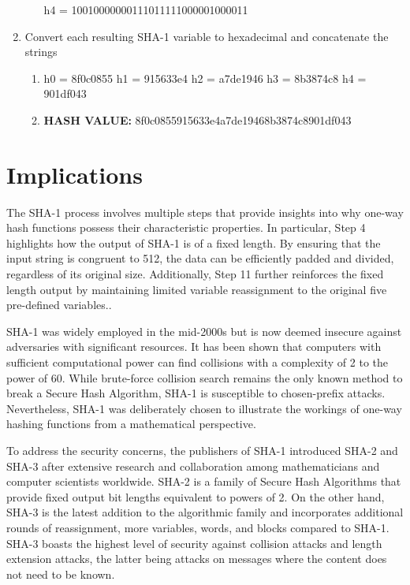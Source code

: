 \documentclass[12pt]{extarticle}
\begin{document}
\begin{enumerate}
\begin{enumerate}
                h4 = 10010000000111011111000001000011\\
    \end{enumerate}
  \item Convert each resulting SHA-1 variable to hexadecimal and concatenate the strings
      \begin{enumerate}
        \item   h0 = 8f0c0855
                h1 = 915633e4
                h2 = a7de1946
                h3 = 8b3874c8
                h4 = 901df043
        \item {\textbf{HASH VALUE:}} 8f0c0855915633e4a7de19468b3874c8901df043
    \end{enumerate}
\end{enumerate}

\section{Implications}

The SHA-1 process involves multiple steps that provide insights into why one-way hash functions possess their characteristic properties. In particular, Step 4 highlights how the output of SHA-1 is of a fixed length. By ensuring that the input string is congruent to 512, the data can be efficiently padded and divided, regardless of its original size. Additionally, Step 11 further reinforces the fixed length output by maintaining limited variable reassignment to the original five pre-defined variables.\cite{src5}.

SHA-1 was widely employed in the mid-2000s but is now deemed insecure against adversaries with significant resources. It has been shown that computers with sufficient computational power can find collisions with a complexity of 2 to the power of 60. While brute-force collision search remains the only known method to break a Secure Hash Algorithm, SHA-1 is susceptible to chosen-prefix attacks. Nevertheless, SHA-1 was deliberately chosen to illustrate the workings of one-way hashing functions from a mathematical perspective.

To address the security concerns, the publishers of SHA-1 introduced SHA-2 and SHA-3 after extensive research and collaboration among mathematicians and computer scientists worldwide. SHA-2 is a family of Secure Hash Algorithms that provide fixed output bit lengths equivalent to powers of 2. On the other hand, SHA-3 is the latest addition to the algorithmic family and incorporates additional rounds of reassignment, more variables, words, and blocks compared to SHA-1. SHA-3 boasts the highest level of security against collision attacks and length extension attacks, the latter being attacks on messages where the content does not need to be known.
\end{document}
